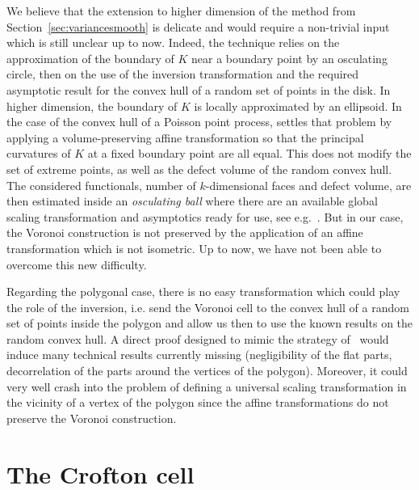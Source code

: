 \documentclass[AHL,Unicode,longabstracts,published]{cedram}
\newcommand{\pass}{\vspace{0.3cm}\noindent}
\begin{document}
We believe that the extension to higher dimension of the method from Section~\ref{sec:variancesmooth} is delicate and would require a non-trivial input which is still unclear up to now. Indeed, the technique relies on the approximation of the boundary of $K$ near a boundary point by an osculating circle, then on the use of the inversion transformation and the required asymptotic result for the convex hull of a random set of points in the disk. In higher dimension, the boundary of $K$ is locally approximated by an ellipsoid. In the case of the convex hull of a Poisson point process, \cite{cy14} settles that problem by applying a volume-preserving affine transformation so that the principal curvatures of $K$ at a fixed boundary point are all equal. This does not modify the set of extreme points, as well as the defect volume of the random convex hull. The considered functionals, number of $k$-dimensional faces and defect volume, are then estimated inside an \emph{osculating ball} where there are an available global scaling transformation and asymptotics ready for use, see e.g.~\cite{CSY,cy14}. But in our case, the Voronoi construction is not preserved by the application of an affine transformation which is not isometric. Up to now, we have not been able to overcome this new difficulty.

Regarding the polygonal case, there is no easy transformation which could play the role of the inversion, i.e. send the Voronoi cell to the convex hull of a random set of points inside the polygon and allow us then to use the known results on the random convex hull. A direct proof designed to mimic the strategy of~\cite{cy17} would induce many technical results currently missing (negligibility of the flat parts, decorrelation of the parts around the vertices of the polygon). Moreover, it could very well crash into the problem of defining a universal scaling transformation in the vicinity of a vertex of the polygon since the affine transformations do not preserve the Voronoi construction.



\section{The Crofton cell}\label{sec:crofton}
\end{document}
